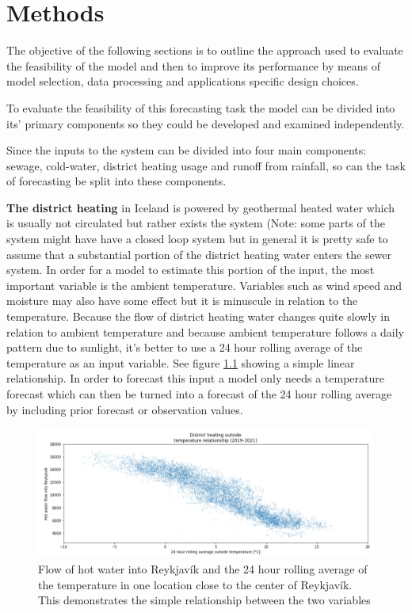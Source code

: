 \chapter{Methods} \label{sec:Methods}
The objective of the following sections is to outline the approach used to evaluate the feasibility of the model and then to improve its performance by means of model selection, data processing and applications specific design choices.

To evaluate the feasibility of this forecasting task the model can be divided into its' primary components so they could be developed and examined independently.

Since the inputs to the system can be divided into four  main components: sewage, cold-water, district heating usage and runoff from rainfall, so can the task of forecasting be split into these components. 

\textbf{The district heating} in Iceland is powered by geothermal heated water which is usually not circulated but rather exists the system (Note: some parts of the system might have have a closed loop system but in general it is pretty safe to assume that a substantial portion of the district heating water enters the sewer system. In order for a model to estimate this portion of the input, the most important variable is the ambient temperature. Variables such as wind speed and moisture may also have some effect but it is minuscule in relation to the temperature. Because the flow of district heating water changes quite slowly in relation to ambient temperature and because ambient temperature follows a daily pattern due to sunlight, it's better to use a 24 hour rolling average of the temperature as an input variable. See figure \ref{fig:DistrictHeatingRelationship} showing a simple linear relationship. In order to forecast this input a model only needs a temperature forecast which can then be turned into a forecast of the 24 hour rolling average by including prior forecast or observation values.

\begin{figure}[H]
\centering\includegraphics[width=\textwidth]{Pictures/Plots/DistrictHeatingTemperature.png}
\caption{Flow of hot water into Reykjavík and the 24 hour rolling average of the temperature in one location close to the center of Reykjavík. This demonstrates  the simple relationship between the two variables}
\label{fig:DistrictHeatingRelationship}
\end{figure}

